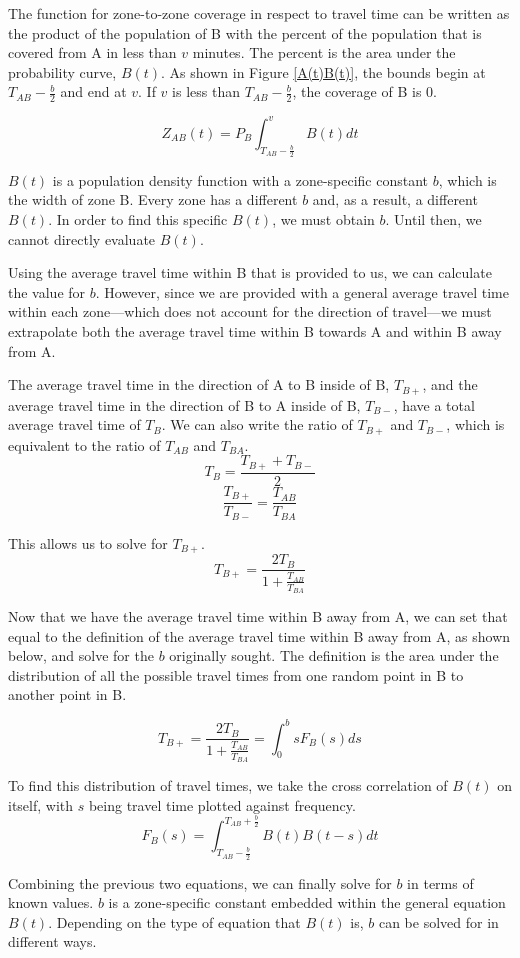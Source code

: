 \documentclass[notitlepage, 12pt]{article}
\begin{document}
The function for zone-to-zone coverage in respect to travel time can be written as the product of the population of B with the percent of the population that is covered from A in less than $v$ minutes. The percent is the area under the probability curve, $B(t)$. As shown in Figure \ref{A(t)B(t)}, the bounds begin at $T_{AB} - \frac{b}{2}$ and end at $v$. If $v$ is less than $T_{AB} - \frac{b}{2}$, the coverage of B is 0.

$$Z_{AB}(t) = P_B \int^v_{T_{AB} - \frac{b}{2}} B(t) dt$$

$B(t)$ is a population density function with a zone-specific constant $b$, which is the width of zone B. Every zone has a different $b$ and, as a result, a different $B(t)$. In order to find this specific $B(t)$, we must obtain $b$. Until then, we cannot directly evaluate $B(t)$.

Using the average travel time within B that is provided to us, we can calculate the value for $b$. However, since we are provided with a general average travel time within each zone---which does not account for the direction of travel---we must extrapolate both the average travel time within B towards A and within B away from A.

The average travel time in the direction of A to B inside of B, $T_{B+}$, and the average travel time in the direction of B to A
inside of B, $T_{B-}$, have a total average travel time of $T_B$. We can also write the ratio of $T_{B+}$ and $T_{B-}$,
which is equivalent to the ratio of $T_{AB}$ and $T_{BA}$.
$$T_B = \frac{T_{B+} + T_{B-}}{2}$$
$$\frac{T_{B+}}{T_{B-}} = \frac{T_{AB}}{T_{BA}}$$

This allows us to solve for $T_{B+}$.
$$T_{B+} = \frac {2T_B}{1+ \frac{T_{AB}}{T_{BA}}}$$

Now that we have the average travel time within B away from A, we can set that equal to the definition of the average travel time within B away from A, as shown below, and solve for the $b$ originally sought. The definition is  the area under the distribution of all the possible travel times from one random point in B to another point in B.

$$T_{B+} = \frac {2T_B}{1+ \frac{T_{AB}}{T_{BA}}} = \int^b_0 s F_B(s) ds$$

To find this distribution of travel times, we take the cross correlation of $B(t)$ on itself, with $s$ being  travel time plotted against frequency.
$$F_B(s) =\int^{T_{AB} + \frac{b}{2}}_{T_{AB} - \frac{b}{2}} B(t) B(t-s) dt$$

Combining the previous two equations, we can finally solve for $b$ in terms of known values. $b$ is a zone-specific constant embedded within the general equation $B(t)$. Depending on the type of equation that $B(t)$ is, $b$ can be solved for in different ways.
\end{document}
